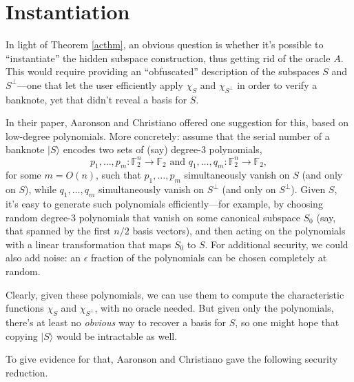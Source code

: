 \documentclass[11pt]{report}
\theoremstyle{plain}
\theoremstyle{definition}
\renewcommand{\ket}[1]{|#1\rangle}
\begin{document}
\section{Instantiation}

In light of Theorem \ref{acthm}, an obvious question is whether it's possible to ``instantiate'' the hidden subspace construction, thus getting rid of the oracle $A$.  This would require providing an ``obfuscated'' description of the subspaces $S$ and $S^\perp$---one that let the user efficiently apply $\chi_S$ and $\chi_{S^\perp}$ in order to verify a banknote, yet that didn't reveal a basis for $S$.

In their paper, Aaronson and Christiano \cite{achristiano} offered one suggestion for this, based on low-degree polynomials.  More concretely: assume that the serial number of a banknote $\ket{S}$ encodes two sets of (say) degree-$3$ polynomials,
$$p_1,\ldots,p_m: \mathbb F_2^n\to \mathbb F_2\text{  and  }q_1,\ldots,q_m: \mathbb F_2^n\to \mathbb F_2,$$
for some $m=O(n)$, such that $p_1,\ldots,p_m$ simultaneously vanish on $S$ (and only on $S$), while $q_1,\ldots,q_m$ simultaneously vanish on $S^\perp$ (and only on $S^\perp$).  Given $S$, it's easy to generate such polynomials efficiently---for example, by choosing random degree-$3$ polynomials that vanish on some canonical subspace $S_0$ (say, that spanned by the first $n/2$ basis vectors), and then acting on the polynomials with a linear transformation that maps $S_0$ to $S$.  For additional security, we could also add noise: an $\epsilon$ fraction of the polynomials can be chosen completely at random.

Clearly, given these polynomials, we can use them to compute the characteristic functions $\chi_S$ and $\chi_{S^\perp}$, with no oracle needed.  But given only the polynomials, there's at least no {\em obvious} way to recover a basis for $S$, so one might hope that copying $\ket{S}$ would be intractable as well.

To give evidence for that, Aaronson and Christiano \cite{achristiano} gave the following security reduction.
\end{document}
